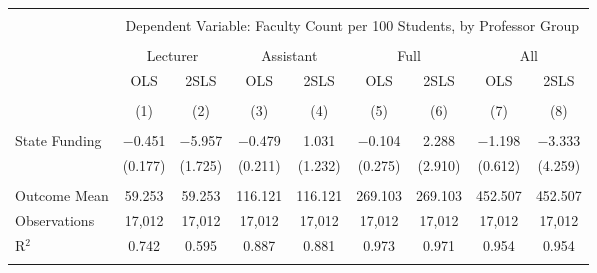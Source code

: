 
\begin{tabular}{@{\extracolsep{5pt}}lcccccccc} 
\\[-1.8ex]\hline 
\hline \\[-1.8ex] 
 & \multicolumn{8}{c}{Dependent Variable: Faculty Count per 100 Students, by Professor Group} \\ 
\cline{2-9} 
\\[-1.8ex] & \multicolumn{2}{c}{Lecturer} & \multicolumn{2}{c}{Assistant} & \multicolumn{2}{c}{Full} & \multicolumn{2}{c}{All} \\ 
 & OLS & 2SLS & OLS & 2SLS & OLS & 2SLS & OLS & 2SLS \\ 
\\[-1.8ex] & (1) & (2) & (3) & (4) & (5) & (6) & (7) & (8)\\ 
\hline \\[-1.8ex] 
 State Funding & $-$0.451 & $-$5.957 & $-$0.479 & 1.031 & $-$0.104 & 2.288 & $-$1.198 & $-$3.333 \\ 
  & (0.177) & (1.725) & (0.211) & (1.232) & (0.275) & (2.910) & (0.612) & (4.259) \\ 
 \hline \\[-1.8ex] 
Outcome Mean & 59.253 & 59.253 & 116.121 & 116.121 & 269.103 & 269.103 & 452.507 & 452.507 \\ 
Observations & 17,012 & 17,012 & 17,012 & 17,012 & 17,012 & 17,012 & 17,012 & 17,012 \\ 
R$^{2}$ & 0.742 & 0.595 & 0.887 & 0.881 & 0.973 & 0.971 & 0.954 & 0.954 \\ 
\hline 
\hline \\[-1.8ex] 
\end{tabular} 
